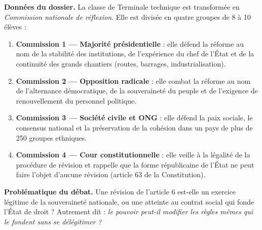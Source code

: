 \documentclass[11pt]{article}
\newcounter{popsec}
\newcounter{popsub}
\newcommand{\courssub}[1]{%
  \stepcounter{popsub}%
  \par\vspace{9pt}\noindent{\popxbold\fontsize{11.5}{13}\selectfont\color{popink}{\color{poporange}\thepopsec.\thepopsub}\hspace{6pt}#1}\par\nopagebreak\vspace{4pt}
}
\begin{document}
\textbf{Données du dossier.} La classe de Terminale technique est transformée en \emph{Commission nationale de réflexion}. Elle est divisée en quatre groupes de 8 à 10 élèves :

\begin{enumerate}
\item \textbf{Commission 1 — Majorité présidentielle} : elle défend la réforme au nom de la stabilité des institutions, de l'expérience du chef de l'État et de la continuité des grands chantiers (routes, barrages, industrialisation).
\item \textbf{Commission 2 — Opposition radicale} : elle combat la réforme au nom de l'alternance démocratique, de la souveraineté du peuple et de l'exigence de renouvellement du personnel politique.
\item \textbf{Commission 3 — Société civile et ONG} : elle défend la paix sociale, le consensus national et la préservation de la cohésion dans un pays de plus de 250 groupes ethniques.
\item \textbf{Commission 4 — Cour constitutionnelle} : elle veille à la légalité de la procédure de révision et rappelle que la forme républicaine de l'État ne peut faire l'objet d'aucune révision (article 63 de la Constitution).
\end{enumerate}

\textbf{Problématique du débat.} Une révision de l'article 6 est-elle un exercice légitime de la souveraineté nationale, ou une atteinte au contrat social qui fonde l'État de droit ? Autrement dit : \emph{le pouvoir peut-il modifier les règles mêmes qui le fondent sans se délégitimer ?}

\courssub{Consignes}
\end{document}
